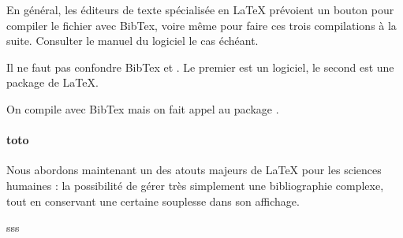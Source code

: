 En général, les éditeurs de texte spécialisée en \LaTeX{} prévoient un bouton pour compiler le fichier  avec BibTex, voire même pour faire ces trois compilations à la suite. Consulter le manuel du logiciel le cas échéant.

\begin{attention}

Il ne faut pas confondre BibTex et . Le premier est un logiciel, le second est une package de \LaTeX{}.

On compile avec BibTex mais on fait appel au package .

\end{attention}



 \paragraph{toto}
 
 \begin{adjustwidth}{4em}{}
 
Nous abordons maintenant un des atouts majeurs de \LaTeX{} pour les sciences humaines : la possibilité de gérer très simplement une bibliographie complexe, tout en conservant une certaine souplesse dans son affichage.

sss

\end{adjustwidth}




